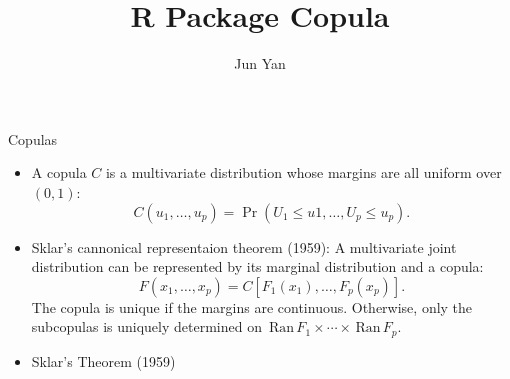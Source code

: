 \documentclass[%
ps,
]{prosper}
\title{R Package Copula}
\author{Jun Yan}
\newcommand{\Ran}{\,\mathrm{Ran}\,}
\begin{document}
\maketitle



\begin{slide}{Copulas}
\begin{itemize}
\item A copula $C$ is a multivariate distribution
whose margins are all uniform over $(0,1)$:
$$C(u_1,\ldots, u_p) = \Pr(U_1 \le u1, \ldots, U_p \le u_p).$$

\item Sklar's cannonical representaion theorem (1959): 
A multivariate joint distribution can be represented 
by its marginal distribution and a copula:
$$F(x_1, \ldots, x_p) = C[F_1(x_1), \ldots, F_p(x_p)].$$
The copula is unique if the margins are continuous.
Otherwise, only the subcopulas is uniquely determined
on $\Ran F_1 \times \cdots \times \Ran F_p$.

\item Sklar's Theorem (1959)

\end{itemize}
  
\end{slide}
\end{document}
